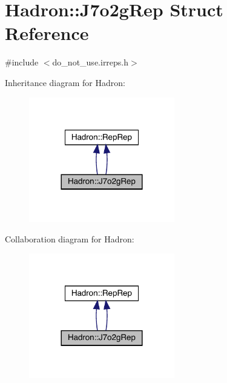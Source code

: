 \hypertarget{structHadron_1_1J7o2gRep}{}\section{Hadron\+:\+:J7o2g\+Rep Struct Reference}
\label{structHadron_1_1J7o2gRep}


{\ttfamily \#include $<$do\+\_\+not\+\_\+use.\+irreps.\+h$>$}



Inheritance diagram for Hadron\+:
\nopagebreak
\begin{figure}[H]
\begin{center}
\leavevmode
\includegraphics[width=180pt]{d0/d39/structHadron_1_1J7o2gRep__inherit__graph}
\end{center}
\end{figure}


Collaboration diagram for Hadron\+:
\nopagebreak
\begin{figure}[H]
\begin{center}
\leavevmode
\includegraphics[width=180pt]{d1/daa/structHadron_1_1J7o2gRep__coll__graph}
\end{center}
\end{figure}
